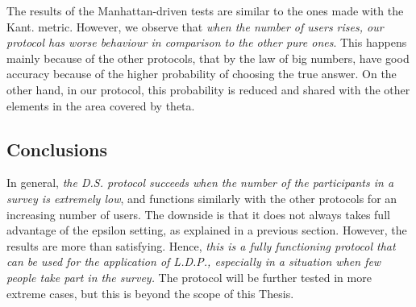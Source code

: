 The results of the Manhattan-driven tests are similar to the ones made with the Kant. metric. However, we observe that \emph{when the number of users rises, our protocol has worse behaviour in comparison to the other pure ones}. This happens mainly because of the other protocols, that by the law of big numbers, have good accuracy because of the higher probability of choosing the true answer. On the other hand, in our protocol, this probability is reduced and shared with the other elements in the area covered by theta. 

\subsection{Conclusions}
In general, \emph{the D.S. protocol succeeds when the number of the participants in a survey is extremely low}, and functions similarly with the other protocols for an increasing number of users. The downside is that it does not always takes full advantage of the epsilon setting, as explained in a previous section. However, the results are more than satisfying. Hence, \emph{this is a fully functioning protocol that can be used for the application of L.D.P., especially in a situation when few people take part in the survey.} The protocol will be further tested in more extreme cases, but this is beyond the scope of this Thesis.
